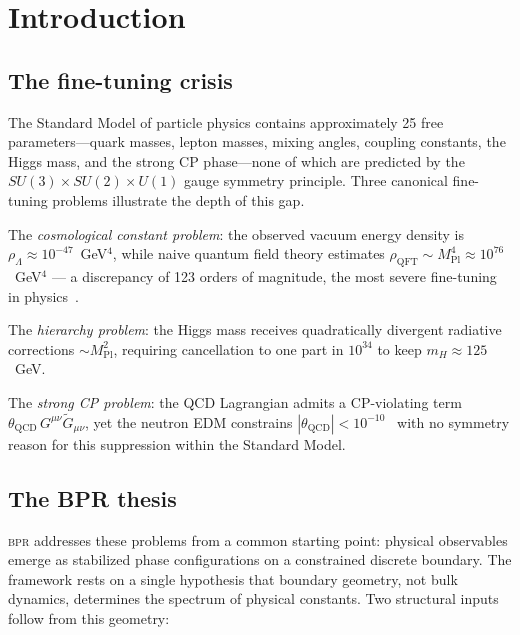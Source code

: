 \documentclass[aps,prd,twocolumn,superscriptaddress,longbibliography,nofootinbib]{revtex4-2}
\newcommand{\bpr}{\textsc{bpr}}
\begin{document}
\section{Introduction}
\label{sec:intro}

\subsection{The fine-tuning crisis}

The Standard Model of particle physics contains approximately 25 free
parameters---quark masses, lepton masses, mixing angles, coupling constants,
the Higgs mass, and the strong CP phase---none of which are predicted by the
$SU(3) \times SU(2) \times U(1)$ gauge symmetry principle.  Three canonical
fine-tuning problems illustrate the depth of this gap.

The \textit{cosmological constant problem}: the observed vacuum energy density
is $\rho_\Lambda \approx 10^{-47}$~GeV$^4$, while naive quantum field theory
estimates $\rho_{\mathrm{QFT}} \sim M_{\mathrm{Pl}}^4 \approx 10^{76}$~GeV$^4$
--- a discrepancy of 123 orders of magnitude, the most severe fine-tuning in
physics~\cite{Weinberg1989}.

The \textit{hierarchy problem}: the Higgs mass receives quadratically divergent
radiative corrections $\sim M_{\mathrm{Pl}}^2$, requiring cancellation to one
part in $10^{34}$ to keep $m_H \approx 125$~GeV.

The \textit{strong CP problem}: the QCD Lagrangian admits a CP-violating term
$\theta_{\mathrm{QCD}}\, G^{\mu\nu}\tilde{G}_{\mu\nu}$, yet the neutron EDM
constrains $|\theta_{\mathrm{QCD}}| < 10^{-10}$~\cite{PDG2024} with no
symmetry reason for this suppression within the Standard Model.

\subsection{The BPR thesis}

\bpr{} addresses these problems from a common starting point: physical
observables emerge as stabilized phase configurations on a constrained
discrete boundary.  The framework rests on a single hypothesis that boundary
geometry, not bulk dynamics, determines the spectrum of physical constants.
Two structural inputs follow from this geometry:
\end{document}
